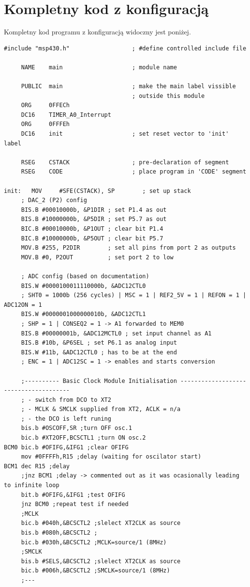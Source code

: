 \documentclass{article}
\begin{document}
\newpage
\section{Kompletny kod z konfiguracją}
Kompletny kod programu z konfiguracją widoczny jest poniżej.
\begin{verbatim}
#include "msp430.h"                  ; #define controlled include file
 
     NAME    main                    ; module name

     PUBLIC  main                    ; make the main label vissible
                                     ; outside this module
     ORG     0FFECh
     DC16    TIMER_A0_Interrupt
     ORG     0FFFEh                  
     DC16    init                    ; set reset vector to 'init' label

     RSEG    CSTACK                  ; pre-declaration of segment
     RSEG    CODE                    ; place program in 'CODE' segment

init:   MOV     #SFE(CSTACK), SP        ; set up stack
     ; DAC_2 (P2) config
     BIS.B #00010000b, &P1DIR ; set P1.4 as out
     BIS.B #10000000b, &P5DIR ; set P5.7 as out
     BIC.B #00010000b, &P1OUT ; clear bit P1.4
     BIC.B #10000000b, &P5OUT ; clear bit P5.7
     MOV.B #255, P2DIR        ; set all pins from port 2 as outputs
     MOV.B #0, P2OUT          ; set port 2 to low

     ; ADC config (based on documentation)
     BIS.W #0000100011110000b, &ADC12CTL0
     ; SHT0 = 1000b (256 cycles) | MSC = 1 | REF2_5V = 1 | REFON = 1 | ADC12ON = 1
     BIS.W #0000001000000010b, &ADC12CTL1
     ; SHP = 1 | CONSEQ2 = 1 -> A1 forwarded to MEM0
     BIS.B #00000001b, &ADC12MCTL0 ; set input channel as A1
     BIS.B #10b, &P6SEL ; set P6.1 as analog input
     BIS.W #11b, &ADC12CTL0 ; has to be at the end
     ; ENC = 1 | ADC12SC = 1 -> enables and starts conversion

     ;---------- Basic Clock Module Initialisation --------------------------------------
     ; - switch from DCO to XT2
     ; - MCLK & SMCLK supplied from XT2, ACLK = n/a
     ; - the DCO is left runing
     bis.b #OSCOFF,SR ;turn OFF osc.1
     bic.b #XT2OFF,BCSCTL1 ;turn ON osc.2
BCM0 bic.b #OFIFG,&IFG1 ;clear OFIFG
     mov #0FFFFh,R15 ;delay (waiting for oscilator start)
BCM1 dec R15 ;delay
     ;jnz BCM1 ;delay -> commented out as it was ocasionally leading to infinite loop
     bit.b #OFIFG,&IFG1 ;test OFIFG
     jnz BCM0 ;repeat test if needed
     ;MCLK
     bic.b #040h,&BCSCTL2 ;slelect XT2CLK as source
     bis.b #080h,&BCSCTL2 ;
     bic.b #030h,&BCSCTL2 ;MCLK=source/1 (8MHz)
     ;SMCLK
     bis.b #SELS,&BCSCTL2 ;slelect XT2CLK as source
     bic.b #006h,&BCSCTL2 ;SMCLK=source/1 (8MHz)
     ;---


\end{verbatim}
\end{document}
